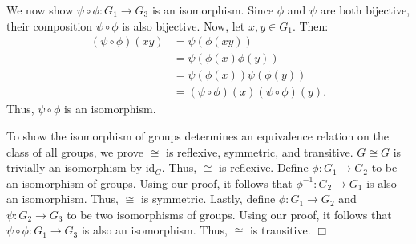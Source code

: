 \documentclass[11pt, a4paper]{article}
\begin{document}
We now show $\psi \circ \phi : G_1 \rightarrow G_3$ is an isomorphism. Since $\phi$ and $\psi$ are both bijective, their composition $\psi \circ \phi$ is also bijective. Now, let $x, y \in G_1$. Then:
\begin{align*}
  (\psi \circ \phi)(xy) &= \psi(\phi(xy))  \\
                        &= \psi(\phi(x) \phi(y)) \\
                        &= \psi(\phi(x)) \psi(\phi(y)) \\
                        &= (\psi \circ \phi)(x) (\psi \circ \phi)(y).
\end{align*}
Thus, $\psi \circ \phi$ is an isomorphism.

To show the isomorphism of groups determines an equivalence relation on the class of all groups, we prove $\cong$ is reflexive, symmetric, and transitive. $G \cong G$ is trivially an isomorphism by id$_{G}$. Thus, $\cong$ is reflexive. Define $\phi : G_1 \rightarrow G_2$ to be an isomorphism of groups. Using our proof, it follows that $\phi^{-1} : G_2 \rightarrow G_1$ is also an isomorphism. Thus, $\cong$ is symmetric. Lastly, define $\phi : G_1 \rightarrow G_2$ and $\psi : G_2 \rightarrow G_3$ to be two isomorphisms of groups. Using our proof, it follows that $\psi \circ \phi : G_1 \rightarrow G_3$ is also an isomorphism. Thus, $\cong$ is transitive. $\Box$
\end{document}
